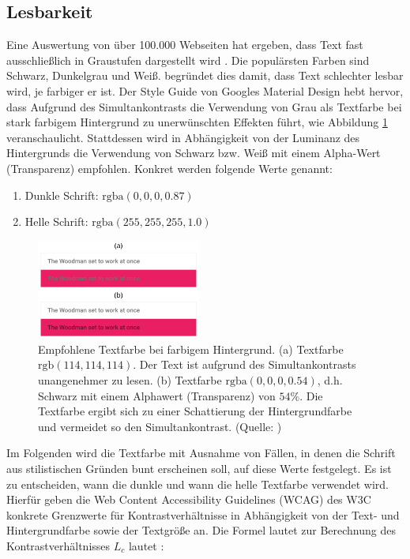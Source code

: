 \documentclass[11pt, bibliography=totoc]{scrartcl}
\begin{document}
\subsection{Lesbarkeit}
\label{sec:lesbarkeit}

Eine Auswertung von über 100.000 Webseiten hat ergeben, dass Text fast ausschließlich in Graustufen dargestellt wird \citep{webzeitgeist}. Die populärsten Farben sind Schwarz, Dunkelgrau und Weiß. \citet{webdesign} begründet dies damit, dass Text schlechter lesbar wird, je farbiger er ist. Der Style Guide von Googles Material Design \citep{google} hebt hervor, dass Aufgrund des Simultankontrasts die Verwendung von Grau als Textfarbe bei stark farbigem Hintergrund zu unerwünschten Effekten führt, wie Abbildung \ref{fig:text_color} veranschaulicht. Stattdessen wird in Abhängigkeit von der Luminanz des Hintergrunds die Verwendung von Schwarz bzw. Weiß mit einem Alpha-Wert (Transparenz) empfohlen. Konkret werden folgende Werte genannt:
\begin{enumerate}
	\item Dunkle Schrift: $\text{rgba}(0, 0, 0, 0.87)$
	\item Helle Schrift: $\text{rgba}(255, 255, 255, 1.0)$
\end{enumerate}

\begin{figure}[h]
	\centering
	\includegraphics[width=0.48\textwidth]{img/text_color.png}
	\caption{Empfohlene Textfarbe bei farbigem Hintergrund. (a) Textfarbe $\text{rgb}(114,114,114)$. Der Text ist aufgrund des Simultankontrasts unangenehmer zu lesen. (b) Textfarbe $\text{rgba}(0, 0, 0, 0.54)$, d.h. Schwarz mit einem Alphawert (Transparenz) von $54\%$. Die Textfarbe ergibt sich zu einer Schattierung der Hintergrundfarbe und vermeidet so den Simultankontrast. (Quelle: \citep{google})}
	\label{fig:text_color}
\end{figure}

Im Folgenden wird die Textfarbe mit Ausnahme von Fällen, in denen die Schrift aus stilistischen Gründen bunt erscheinen soll, auf diese Werte festgelegt. Es ist zu entscheiden, wann die dunkle und wann die helle Textfarbe verwendet wird. Hierfür geben die Web Content Accessibility Guidelines (WCAG) des W3C konkrete Grenzwerte für Kontrastverhältnisse in Abhängigkeit von der Text- und Hintergrundfarbe sowie der Textgröße an. Die Formel lautet zur Berechnung des Kontrastverhältnisses $L_c$ lautet \citep{wcag-contrast}:
\end{document}
